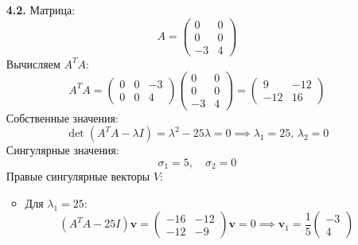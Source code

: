 \documentclass[a4paper]{article}
\begin{document}
\begin{enumerate}
\begin{enumerate}
  \item[\textbf{4.2.}]Матрица:  
  \[
  A = \begin{pmatrix}
  0 & 0 \\
  0 & 0 \\
  -3 & 4
  \end{pmatrix}
  \]
  Вычисляем \( A^T A \):  
  \[
  A^T A = \begin{pmatrix}
  0 & 0 & -3 \\
  0 & 0 & 4
  \end{pmatrix} \begin{pmatrix}
  0 & 0 \\
  0 & 0 \\
  -3 & 4
  \end{pmatrix} = \begin{pmatrix}
  9 & -12 \\
  -12 & 16
  \end{pmatrix}
  \]
  Собственные значения:  
  \[
  \det(A^T A - \lambda I) = \lambda^2 - 
  25\lambda = 0 \implies \lambda_1 = 25, \, \lambda_2 = 0
  \]  
  Сингулярные значения:  
  \[
  \sigma_1 = 5, \quad \sigma_2 = 0
  \]
  Правые сингулярные векторы \( V \):  
  \begin{itemize}
    \item 
    Для \( \lambda_1 = 25 \):  
    \[
    (A^T A - 25I)\mathbf{v} = \begin{pmatrix}
    -16 & -12 \\
    -12 & -9
    \end{pmatrix}\mathbf{v} = 0 \implies \mathbf{v}_1 = 
    \frac{1}{5} \begin{pmatrix} -3 \\ 4 \end{pmatrix}
    \]
    

\end{itemize}
\end{enumerate}
\end{enumerate}
\end{document}
